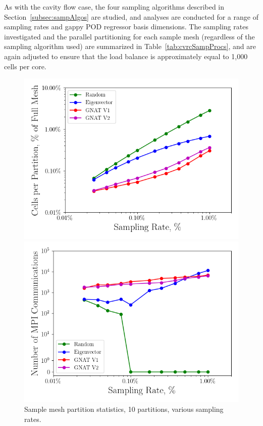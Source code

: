 As with the cavity flow case, the four sampling algorithms described in Section~\ref{subsec:sampAlgos} are studied, and analyses are conducted for a range of sampling rates and gappy POD regressor basis dimensions. The sampling rates investigated and the parallel partitioning for each sample mesh (regardless of the sampling algorithm used) are summarized in Table~\ref{tab:cvrcSampProcs}, and are again adjusted to ensure that the load balance is approximately equal to 1,000 cells per core.

\begin{figure}
	\begin{minipage}{0.49\linewidth}
		\includegraphics[width=0.99\linewidth]{Chapters/CavityAndCVRC/Images/cvrc/deim/stats/cvrc_partition_stats.png}
	\end{minipage}
	\begin{minipage}{0.49\linewidth}
		\includegraphics[width=0.99\linewidth]{Chapters/CavityAndCVRC/Images/cvrc/deim/stats/cvrc_partition_comms.png}
	\end{minipage}
	\caption{Sample mesh partition statistics, 10 partitions, various sampling rates.}
\end{figure}

